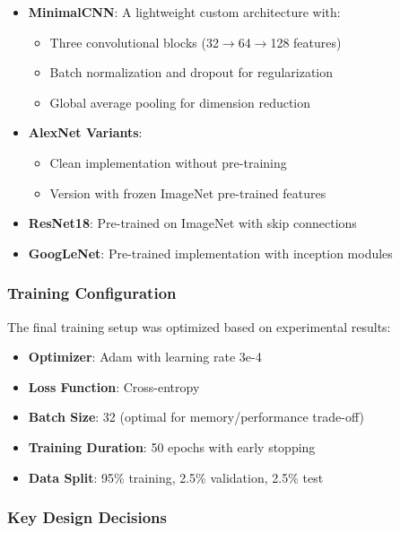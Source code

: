 \documentclass[conference]{IEEEtran}
\begin{document}
\begin{itemize}
    \item \textbf{MinimalCNN}: A lightweight custom architecture with:
    \begin{itemize}
        \item Three convolutional blocks (32$\rightarrow$64$\rightarrow$128 features)
        \item Batch normalization and dropout for regularization
        \item Global average pooling for dimension reduction
    \end{itemize}
    
    \item \textbf{AlexNet Variants}:
    \begin{itemize}
        \item Clean implementation without pre-training
        \item Version with frozen ImageNet pre-trained features
    \end{itemize}
    
    \item \textbf{ResNet18}: Pre-trained on ImageNet with skip connections
    \item \textbf{GoogLeNet}: Pre-trained implementation with inception modules
\end{itemize}

\subsubsection{Training Configuration}

The final training setup was optimized based on experimental results:

\begin{itemize}
    \item \textbf{Optimizer}: Adam with learning rate 3e-4
    \item \textbf{Loss Function}: Cross-entropy
    \item \textbf{Batch Size}: 32 (optimal for memory/performance trade-off)
    \item \textbf{Training Duration}: 50 epochs with early stopping
    \item \textbf{Data Split}: 95\% training, 2.5\% validation, 2.5\% test
\end{itemize}

\subsubsection{Key Design Decisions}
\end{document}
